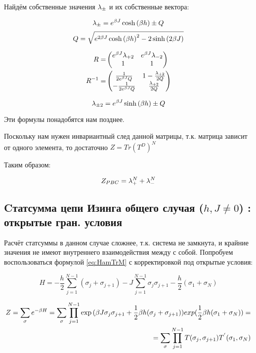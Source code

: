 Найдём собственные значения $\lambda_{\pm}$ и их собственные вектора:

\[ \lambda_{\pm} = e^{\beta J}  \cosh{(\beta h)} \pm Q\]
\[ Q = \sqrt{e^{2\beta J} \cosh{(\beta h)}^{2} - 2 \sinh{(2\beta J)}} \]

\begin{align}\label{R}
R = &
\begin{pmatrix*}
  e^{\bj}\lpd & e^{\bj}\lmd \\
  1 & 1
\end{pmatrix*}\\
\label{RInv}
R^{-1} = &
\begin{pmatrix*}
  \frac{1}{2e^{\bj}Q} & 1-\frac{\lpd}{2Q} \\
  -\frac{1}{2e^{\bj}Q} & \frac{\lpd}{2Q}
\end{pmatrix*}
\end{align}

\[ \lambda_{\pm2} = e^{\beta J}  \sinh{(\beta h)} \pm Q\]

Эти формулы понадобятся нам позднее.

Поскольку нам нужен инвариантный след данной матрицы, т.к. матрица зависит от одного элемента, то достаточно $ Z = Tr(T^{D})^{N} $

Таким образом:

\begin{equation}\label{Zpbc}
Z_{PBC} = \lambda_{+}^{N} + \lambda _{-} ^{N}     
\end{equation}

\subsection{Cтатсумма цепи Изинга общего случая ($h, J \neq 0 $) : открытые гран. условия}

Расчёт статсуммы в данном случае сложнее, т.к. система не замкнута, и крайние значения не имеют внутреннего взаимодействия между с собой. Попробуем воспользоваться формулой \eqref{eq:HamTrM} с корректировкой под открытые условия:

\begin{equation}\label{eq:HamTrM2}
    H = - \frac{h}{2}\sum_{j = 1}^{N-1}  (\sigma_{j} + \sigma_{j+1}) - J \sum_{j = 1}^{N-1} \sigma_{j}  \sigma_{j+1} - \frac{h}{2}(\sigma_{1} + \sigma_{N})
\end{equation}

\begin{align*}\label{ZTrM}
    Z = \sum_{\sigma} e^{-\beta H} = \sum_{\sigma} \prod_{j=1}^{N-1} \exp{(\beta J\sigma_{j}\sigma_{j+1} + \frac{1}{2}\beta h(\sigma_{j} + \sigma_{j+1}))} exp(\frac{1}{2}\beta h(\sigma_{1}+\sigma_{N})) = \\
    = \sum_{\sigma} \prod_{j=1}^{N-1} T(\sigma_{j}, \sigma_{j+1}) T^{'}(\sigma_{1}, \sigma_{N})
\end{align*}

